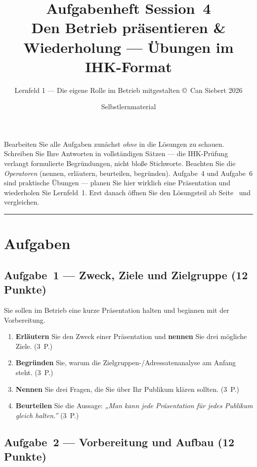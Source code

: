 \documentclass[11pt, a4paper]{article}
\title{\vspace*{-1.5cm}\Huge\bfseries\color{bfwPrimaryDark}Aufgabenheft Session~4\\[0.4em]
  \large\color{bfwInkSoft}\textnormal{Den Betrieb präsentieren \& Wiederholung --- Übungen im IHK-Format}}
\author{\textsf{Lernfeld 1 --- Die eigene Rolle im Betrieb mitgestalten \textperiodcentered{} \small\copyright\ Can Siebert\,\textperiodcentered\,2026}}
\date{Selbstlernmaterial}
\begin{document}
\maketitle
\thispagestyle{empty}

\begin{merksatz}[title={\bfseries So nutzen Sie dieses Aufgabenheft}]
Bearbeiten Sie alle Aufgaben zunächst \emph{ohne} in die Lösungen zu schauen. Schreiben
Sie Ihre Antworten in vollständigen Sätzen --- die IHK-Prüfung verlangt formulierte
Begründungen, nicht bloße Stichworte. Beachten Sie die \emph{Operatoren} (nennen,
erläutern, beurteilen, begründen). Aufgabe~4 und Aufgabe~6 sind praktische Übungen ---
planen Sie hier wirklich eine Präsentation und wiederholen Sie Lernfeld~1. Erst danach
öffnen Sie den Lösungsteil ab Seite~\pageref{loesungen} und vergleichen.
\end{merksatz}

\tableofcontents
\vspace{1em}
\hrule

\section{Aufgaben}

\subsection*{Aufgabe~1 --- Zweck, Ziele und Zielgruppe (12 Punkte)}

\medskip
Sie sollen im Betrieb eine kurze Präsentation halten und beginnen mit der Vorbereitung.

\begin{enumerate}[label=(\alph*)]
  \item \textbf{Erläutern} Sie den Zweck einer Präsentation und \textbf{nennen} Sie drei mögliche Ziele. \hfill (3~P.)
  \item \textbf{Begründen} Sie, warum die Zielgruppen-/Adressatenanalyse am Anfang steht. \hfill (3~P.)
  \item \textbf{Nennen} Sie drei Fragen, die Sie über Ihr Publikum klären sollten. \hfill (3~P.)
  \item \textbf{Beurteilen} Sie die Aussage: \emph{„Man kann jede Präsentation für jedes Publikum gleich halten.”} \hfill (3~P.)
\end{enumerate}

\subsection*{Aufgabe~2 --- Vorbereitung und Aufbau (12 Punkte)}
\end{document}

